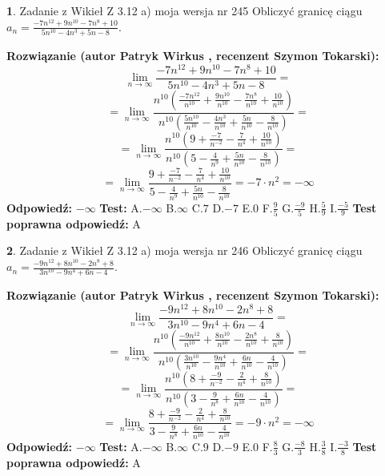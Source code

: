 \documentclass[12pt, a4paper]{article}
\theoremstyle{definition} %
\newtheorem{zad}{}
\newcommand{\zadStart}[1]{\begin{zad}#1\newline}
\newcommand{\zadStop}{\end{zad}}
\newcommand{\rozwStart}[2]{\noindent \textbf{Rozwiązanie (autor #1 , recenzent #2): }\newline}
\newcommand{\rozwStop}{\newline}
\newcommand{\odpStart}{\noindent \textbf{Odpowiedź:}\newline}
\newcommand{\odpStop}{\newline}
\newcommand{\testStart}{\noindent \textbf{Test:}\newline}
\newcommand{\testStop}{\newline}
\newcommand{\kluczStart}{\noindent \textbf{Test poprawna odpowiedź:}\newline}
\newcommand{\kluczStop}{\newline}
\begin{document}
\zadStart{Zadanie z Wikieł Z 3.12 a) moja wersja nr 245}
Obliczyć granicę ciągu $a_{n}=\frac{-7n^{12}+9n^{10}-7n^{8}+10}{5n^{10}-4n^{3}+5n-8}$.
\zadStop
\rozwStart{Patryk Wirkus}{Szymon Tokarski}
$$\lim\limits_{n\to\infty}\frac{-7n^{12}+9n^{10}-7n^{8}+10}{5n^{10}-4n^{3}+5n-8}=$$
$$=\lim\limits_{n\to\infty}\frac{n^{10}\left(\frac{-7n^{12}}{n^{10}}+\frac{9n^{10}}{n^{10}}-\frac{7n^{8}}{n^{10}}+\frac{10}{n^{10}}\right)}{n^{10}\left(\frac{5n^{10}}{n^{10}}-\frac{4n^{3}}{n^{10}}+\frac{5n}{n^{10}}-\frac{8}{n^{10}}\right)}=$$
$$=\lim\limits_{n\to\infty}\frac{n^{10}\left(9+\frac{-7}{n^{-2}}-\frac{7}{n^{4}}+\frac{10}{n^{10}}\right)}
{n^{10}\left(5-\frac{4}{n^{9}}+\frac{5n}{n^{10}}-\frac{8}{n^{10}}\right)}=$$
$$=\lim\limits_{n\to\infty}\frac{9+\frac{-7}{n^{-2}}-\frac{7}{n^{4}}+\frac{10}{n^{10}}}{5-\frac{4}{n^{9}}+\frac{5n}{n^{10}}-\frac{8}{n^{10}}}=-7\cdot n^{2} = -\infty$$
\rozwStop
\odpStart
$-\infty$
\odpStop
\testStart
A.$-\infty$
B.$\infty$
C.$7$
D.$-7$
E.$0$
F.$\frac{9}{5}$
G.$\frac{-9}{5}$
H.$\frac{5}{9}$
I.$\frac{-5}{9}$
\testStop
\kluczStart
A
\kluczStop



\zadStart{Zadanie z Wikieł Z 3.12 a) moja wersja nr 246}
Obliczyć granicę ciągu $a_{n}=\frac{-9n^{12}+8n^{10}-2n^{8}+8}{3n^{10}-9n^{4}+6n-4}$.
\zadStop
\rozwStart{Patryk Wirkus}{Szymon Tokarski}
$$\lim\limits_{n\to\infty}\frac{-9n^{12}+8n^{10}-2n^{8}+8}{3n^{10}-9n^{4}+6n-4}=$$
$$=\lim\limits_{n\to\infty}\frac{n^{10}\left(\frac{-9n^{12}}{n^{10}}+\frac{8n^{10}}{n^{10}}-\frac{2n^{8}}{n^{10}}+\frac{8}{n^{10}}\right)}{n^{10}\left(\frac{3n^{10}}{n^{10}}-\frac{9n^{4}}{n^{10}}+\frac{6n}{n^{10}}-\frac{4}{n^{10}}\right)}=$$
$$=\lim\limits_{n\to\infty}\frac{n^{10}\left(8+\frac{-9}{n^{-2}}-\frac{2}{n^{4}}+\frac{8}{n^{10}}\right)}
{n^{10}\left(3-\frac{9}{n^{8}}+\frac{6n}{n^{10}}-\frac{4}{n^{10}}\right)}=$$
$$=\lim\limits_{n\to\infty}\frac{8+\frac{-9}{n^{-2}}-\frac{2}{n^{4}}+\frac{8}{n^{10}}}{3-\frac{9}{n^{8}}+\frac{6n}{n^{10}}-\frac{4}{n^{10}}}=-9\cdot n^{2} = -\infty$$
\rozwStop
\odpStart
$-\infty$
\odpStop
\testStart
A.$-\infty$
B.$\infty$
C.$9$
D.$-9$
E.$0$
F.$\frac{8}{3}$
G.$\frac{-8}{3}$
H.$\frac{3}{8}$
I.$\frac{-3}{8}$
\testStop
\kluczStart
A
\kluczStop
\end{document}
